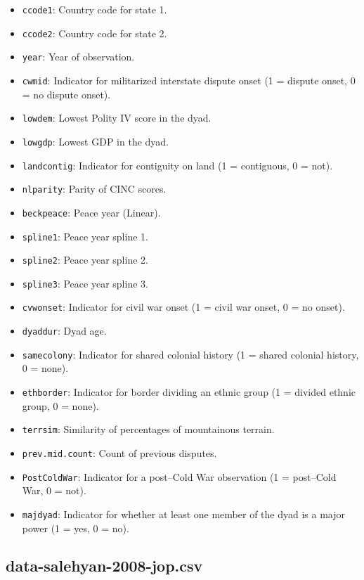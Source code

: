 \documentclass[12pt]{article}
\begin{document}
\begin{itemize}
  \item \texttt{ccode1}: Country code for state 1.
  \item \texttt{ccode2}: Country code for state 2. 
  \item \texttt{year}: Year of observation.
  \item \texttt{cwmid}: Indicator for militarized interstate dispute onset (1 = dispute onset, 0 = no dispute onset).
  \item \texttt{lowdem}: Lowest Polity IV score in the dyad.
  \item \texttt{lowgdp}: Lowest GDP in the dyad.
  \item \texttt{landcontig}: Indicator for contiguity on land (1 = contiguous, 0 = not).
  \item \texttt{nlparity}: Parity of CINC scores.
  \item \texttt{beckpeace}: Peace year (Linear).
  \item \texttt{spline1}: Peace year spline 1.
  \item \texttt{spline2}: Peace year spline 2.
  \item \texttt{spline3}: Peace year spline 3.
  \item \texttt{cvwonset}: Indicator for civil war onset (1 = civil war onset, 0 = no onset).
  \item \texttt{dyaddur}: Dyad age.
  \item \texttt{samecolony}: Indicator for shared colonial history (1 = shared colonial history, 0 = none).
  \item \texttt{ethborder}: Indicator for border dividing an ethnic group (1 = divided ethnic group, 0 = none).
  \item \texttt{terrsim}: Similarity of percentages of mountainous terrain.
  \item \texttt{prev.mid.count}: Count of previous disputes.
  \item \texttt{PostColdWar}: Indicator for a post--Cold War observation (1 = post--Cold War, 0 = not).
  \item \texttt{majdyad}: Indicator for whether at least one member of the dyad is a major power (1 = yes, 0 = no).
\end{itemize}


\subsection{data-salehyan-2008-jop.csv}
\end{document}
